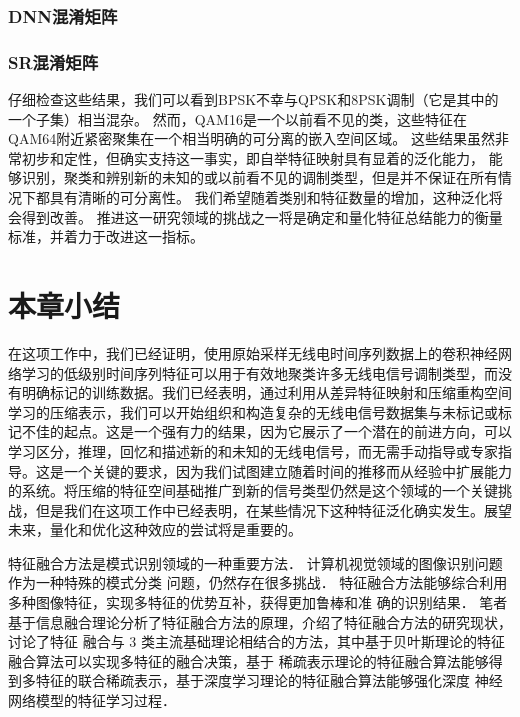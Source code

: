 \subsubsection{DNN混淆矩阵}

\subsubsection{SR混淆矩阵}

仔细检查这些结果，我们可以看到BPSK不幸与QPSK和8PSK调制（它是其中的一个子集）相当混杂。
然而，QAM16是一个以前看不见的类，这些特征在QAM64附近紧密聚集在一个相当明确的可分离的嵌入空间区域。
这些结果虽然非常初步和定性，但确实支持这一事实，即自举特征映射具有显着的泛化能力，
能够识别，聚类和辨别新的未知的或以前看不见的调制类型，但是并不保证在所有情况下都具有清晰的可分离性。
我们希望随着类别和特征数量的增加，这种泛化将会得到改善。
推进这一研究领域的挑战之一将是确定和量化特征总结能力的衡量标准，并着力于改进这一指标。\par

\section{本章小结}


在这项工作中，我们已经证明，使用原始采样无线电时间序列数据上的卷积神经网络学习的低级别时间序列特征可以用于有效地聚类许多无线电信号调制类型，而没有明确标记的训练数据。我们已经表明，通过利用从差异特征映射和压缩重构空间学习的压缩表示，我们可以开始组织和构造复杂的无线电信号数据集与未标记或标记不佳的起点。这是一个强有力的结果，因为它展示了一个潜在的前进方向，可以学习区分，推理，回忆和描述新的和未知的无线电信号，而无需手动指导或专家指导。这是一个关键的要求，因为我们试图建立随着时间的推移而从经验中扩展能力的系统。将压缩的特征空间基础推广到新的信号类型仍然是这个领域的一个关键挑战，但是我们在这项工作中已经表明，在某些情况下这种特征泛化确实发生。展望未来，量化和优化这种效应的尝试将是重要的。\par

特征融合方法是模式识别领域的一种重要方法． 计算机视觉领域的图像识别问题作为一种特殊的模式分类
问题，仍然存在很多挑战． 特征融合方法能够综合利用多种图像特征，实现多特征的优势互补，获得更加鲁棒和准
确的识别结果． 笔者基于信息融合理论分析了特征融合方法的原理，介绍了特征融合方法的研究现状，讨论了特征
融合与 3 类主流基础理论相结合的方法，其中基于贝叶斯理论的特征融合算法可以实现多特征的融合决策，基于
稀疏表示理论的特征融合算法能够得到多特征的联合稀疏表示，基于深度学习理论的特征融合算法能够强化深度
神经网络模型的特征学习过程．\par
